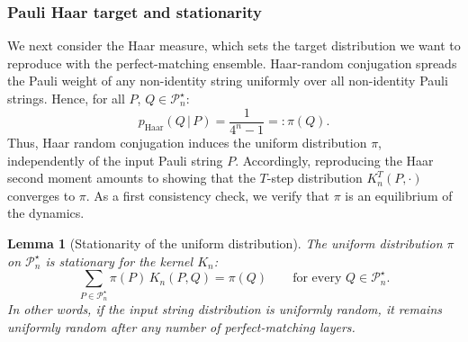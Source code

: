 \documentclass[
    aps,
    superscriptaddress,
    onecolumn,
    10pt,
    prx,
    nofootinbib
]{revtex4-2}
\newtheorem{lemma}{Lemma}
\theoremstyle{namedstatement}
\theoremstyle{plain}
\begin{document}
\subsubsection{Pauli Haar target and stationarity}
\label{sec:pauli_haar}

We next consider the Haar measure, which sets the target distribution we want to reproduce with the perfect-matching ensemble. Haar-random conjugation spreads the Pauli weight of any non-identity string uniformly over all non-identity Pauli strings. Hence, for all $P$, $Q \in\mathcal{P}_n^{\star}$: 
\begin{equation}
\label{eq:haar_dstr}
p_{\mathrm{Haar}}(Q \,|\, P) = \frac{1}{4^n - 1}=:\pi(Q).
\end{equation}
Thus, Haar random conjugation induces the uniform distribution $\pi$, independently of the input Pauli string $P$. Accordingly, reproducing the Haar second moment amounts to showing that the $T$-step distribution $K_n^T(P, \cdot)$ converges to $\pi$. As a first consistency check, we verify that $\pi$ is an equilibrium of the dynamics.

\begin{lemma}[Stationarity of the uniform distribution]\label{lem:stationarity}
The uniform distribution $\pi$ on $\mathcal{P}_n^\star$ is stationary for the kernel $K_n$:
\begin{equation}
    \sum_{P \in \mathcal{P}_n^\star} \pi(P)\, K_n(P,Q) = \pi(Q)
    \qquad \text{for every } Q \in \mathcal{P}_n^\star.
\end{equation}
In other words, if the input string distribution is uniformly random, it remains uniformly random after any number of perfect-matching layers.
\end{lemma}
\end{document}
